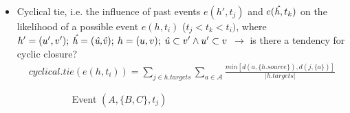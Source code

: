 \begin{itemize}
\begin{itemize}
		\item Cyclical tie, i.e. the influence of past events $e(h',t_j)$ and $e(\text{\emph{\^h}},t_k)$ on the likelihood of a possible event $e(h,t_i)$ ($t_j < t_k < t_i)$, where $h' = (u',v'); \: \text{\emph{\^h}} = (\text{\emph{\^u,\^v}}); \: h = (u,v); \: \text{\emph{\^u}} \subset v' \land u' \subset v$ $\rightarrow$ is there a tendency for cyclic closure?
		\begin{align*}
			cyclical.tie(e(h,t_i)) = \sum_{j \in h.targets} \sum_{a \in \mathcal{A}} \frac{min[d(a,\{h.source\}),d(j,\{a\})]}{\lvert h.targets \rvert}
		\end{align*}
		\begin{figure}
			\begin{mdframed}
				\centering
				\begin{subfigure}[t]{0.3\linewidth}
					\vskip 0pt
					\caption{Event $(A,\{B,C\},t_j)$}
				\end{subfigure}
				\hfill
				\begin{subfigure}[t]{0.3\linewidth}
					\vskip 0pt
\end{subfigure}
\end{mdframed}
\end{figure}
\end{itemize}
\end{itemize}
